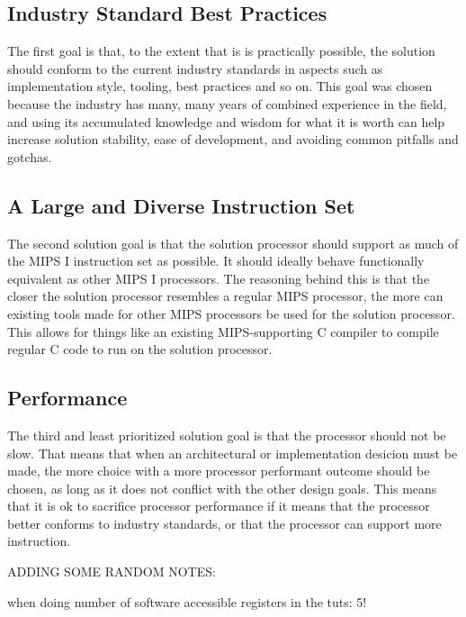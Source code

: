 \subsection{Industry Standard Best Practices}

The first goal is that, to the extent that is is practically possible, the solution should conform to the current industry standards in aspects such as implementation style, tooling, best practices and so on.
This goal was chosen because the industry has many, many years of combined experience in the field, and using its accumulated knowledge and wisdom for what it is worth can help increase solution stability, ease of development, and avoiding common pitfalls and gotchas.

\subsection{A Large and Diverse Instruction Set}

The second solution goal is that the solution processor should support as much of the MIPS I instruction set as possible.
It should ideally behave functionally equivalent as other MIPS I processors.
The reasoning behind this is that the closer the solution processor resembles a regular MIPS processor, the more can existing tools made for other MIPS processors be used for the solution processor.
This allows for things like an existing MIPS-supporting C compiler to compile regular C code to run on the solution processor.

\subsection{Performance}

The third and least prioritized solution goal is that the processor should not be slow.
That means that when an architectural or implementation desicion must be made, the more choice with a more processor performant outcome should be chosen, as long as it does not conflict with the other design goals.
This means that it is ok to sacrifice processor performance if it means that the processor better conforms to industry standards, or that the processor can support more instruction.



ADDING SOME RANDOM NOTES:

when doing number of software accessible registers in the tuts: 5!
